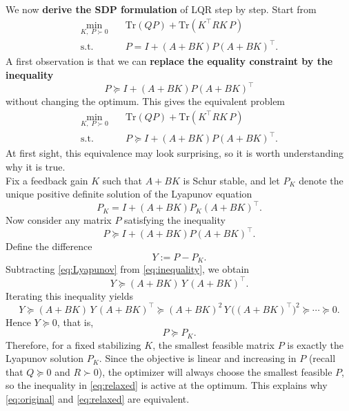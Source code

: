 \medskip

We now \textbf{derive the SDP formulation} of LQR step by step. Start from
\begin{equation}
\begin{aligned}
\min_{K,\;P \succ 0}\quad
& \text{Tr}(QP) + \text{Tr}(K^\top R K\,P) \\
\text{s.t.}\quad
& P = I + (A+BK)P(A+BK)^\top .
\end{aligned}
\label{eq:original}
\end{equation}
A first observation is that we can \textbf{replace the equality constraint by the inequality}
\[
P \succeq I + (A+BK)P(A+BK)^\top
\]
without changing the optimum. This gives the equivalent problem
\begin{equation}
\begin{aligned}
\min_{K,\;P \succ 0}\quad
& \text{Tr}(QP) + \text{Tr}(K^\top R K\,P) \\
\text{s.t.}\quad
& P \succeq I + (A+BK)P(A+BK)^\top .
\end{aligned}
\label{eq:relaxed}
\end{equation}
At first sight, this equivalence may look surprising, so it is worth understanding why it is true.\\
Fix a feedback gain $K$ such that $A+BK$ is Schur stable, and let $P_K$ denote the unique
positive definite solution of the Lyapunov equation
\begin{equation}
P_K = I + (A+BK)P_K(A+BK)^\top.
\label{eq:Lyapunov}
\end{equation}
Now consider any matrix $P$ satisfying the inequality
\begin{equation}
P \succeq I + (A+BK)P(A+BK)^\top.
\label{eq:inequality}
\end{equation}
Define the difference
\[
Y := P - P_K.
\]
Subtracting \eqref{eq:Lyapunov} from \eqref{eq:inequality}, we obtain
\[
Y \succeq (A+BK)\,Y\,(A+BK)^\top.
\]
Iterating this inequality yields
\[
Y \succeq (A+BK)\,Y\,(A+BK)^\top
\succeq (A+BK)^2\,Y\,\big((A+BK)^\top\big)^2
\succeq \cdots \succeq 0.
\]
Hence $Y \succeq 0$, that is,
\[
P \succeq P_K.
\]
Therefore, for a fixed stabilizing $K$, the smallest feasible matrix $P$ is exactly the Lyapunov
solution $P_K$. Since the objective is linear and increasing in $P$ (recall that $Q\succeq 0$ and
$R\succ 0$), the optimizer will always choose the smallest feasible $P$, so the inequality in
\eqref{eq:relaxed} is active at the optimum. This explains why \eqref{eq:original} and \eqref{eq:relaxed} are equivalent.

\medskip

